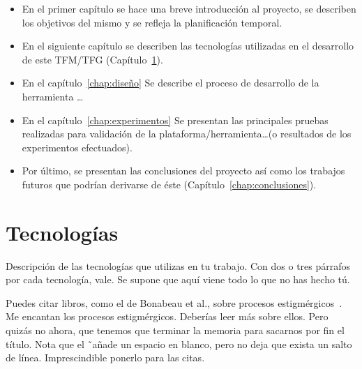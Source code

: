 \documentclass[a4paper, 12pt]{book}
\begin{document}
    \begin{itemize}
      \item En el primer capítulo se hace una breve introducción al proyecto, se describen los objetivos del mismo y se refleja la planificación temporal.
      \item En el siguiente capítulo se describen las tecnologías utilizadas en el desarrollo de este TFM/TFG (Capítulo~\ref{chap:tecnologias}).
      \item En el capítulo~\ref{chap:diseño} Se describe el proceso de desarrollo
      de la herramienta \ldots
      \item En el capítulo~\ref{chap:experimentos} Se presentan las principales pruebas realizadas
      para validación de la plataforma/herramienta\ldots (o resultados de los experimentos
      efectuados).
      \item Por último, se presentan las conclusiones del proyecto así como los trabajos futuros que podrían derivarse de éste (Capítulo~\ref{chap:conclusiones}).
    \end{itemize}

\cleardoublepage


\chapter{Tecnologías}               %
\label{chap:tecnologias}

Descripción de las tecnologías que utilizas en tu trabajo. 
Con dos o tres párrafos por cada tecnología, vale. 
Se supone que aquí viene todo lo que no has hecho tú.

Puedes citar libros, como el de Bonabeau et al., sobre procesos estigmérgicos~\cite{bonabeau:_swarm}. 
Me encantan los procesos estigmérgicos.
Deberías leer más sobre ellos.
Pero quizás no ahora, que tenemos que terminar la memoria para sacarnos por fin el título.
Nota que el \~ \ añade un espacio en blanco, pero no deja que exista un salto de línea. 
Imprescindible ponerlo para las citas.
\end{document}
